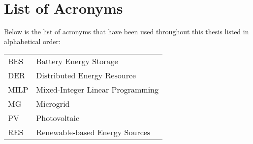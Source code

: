 \thispagestyle{plain}			%
\chapter*{List of Acronyms}
Below is the list of acronyms that have been used throughout this thesis listed in alphabetical order:
\vspace*{1.0cm}

\begin{tabular}{p{3cm}p{12cm}}
BES & Battery Energy Storage\\
DER & Distributed Energy Resource\\
MILP & Mixed-Integer Linear Programming\\
MG & Microgrid \\
PV & Photovoltaic\\
RES & Renewable-based Energy Sources\\
\end{tabular}


\newpage				%
\thispagestyle{empty}
\mbox{}

